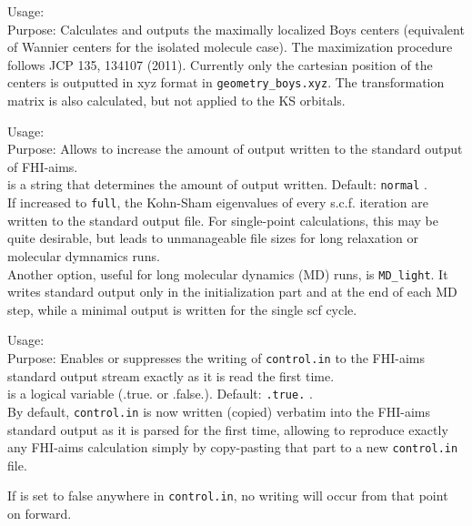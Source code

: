 {
  \noindent
  Usage:  \\[1.0ex]
  Purpose: Calculates and outputs the maximally localized Boys centers
  (equivalent of Wannier centers for the isolated molecule case). The
  maximization procedure follows JCP 135, 134107 (2011). Currently
  only the cartesian position of the centers is outputted in xyz format in \texttt{geometry\_boys.xyz}. 
  The transformation matrix is also calculated, but not applied to the KS orbitals. \\[1.0ex]
}

{
  \noindent
  Usage:   \\[1.0ex]
  Purpose: Allows to increase the amount of output written to the
    standard output of FHI-aims. \\[1.0ex]
   is a string that determines the amount of output
    written. Default: \texttt{normal} . \\
}
If increased to \texttt{full}, the Kohn-Sham eigenvalues of every
s.c.f. iteration are written to the standard output file. For
single-point calculations, this may be quite desirable, but leads to
unmanageable file sizes for long relaxation or molecular dymnamics
runs. \\
Another option, useful for long molecular dynamics (MD) runs, is \texttt{MD\_light}.
It writes standard output only in the initialization part and at the end of each
MD step, while a minimal output is written for the single scf cycle.


{
  \noindent
  Usage:   \\[1.0ex]
  Purpose: Enables or suppresses the writing of \texttt{control.in} to
  the FHI-aims standard output stream exactly as it is read the first
  time. \\[1.0ex] 
   is a logical variable (.true. or .false.). Default: \texttt{.true.} . \\
}
By default, \texttt{control.in} is now written (copied) verbatim into
the FHI-aims standard output as it is parsed for the first time,
allowing to reproduce exactly any FHI-aims calculation simply by
copy-pasting that part to a new \texttt{control.in} file.

If  is set to false anywhere in
\texttt{control.in}, no writing will occur from that point on
forward. 

